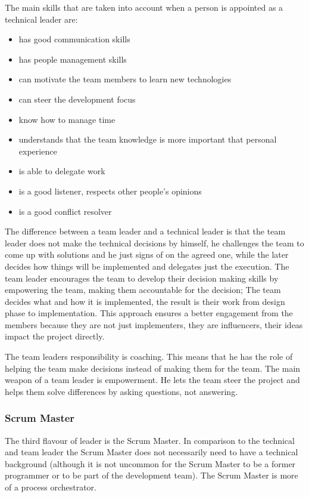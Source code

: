 The main skills that are taken into account when a person is appointed as a technical leader are:

\begin{itemize}
\item has good communication skills
\item has people management skills
\item can motivate the team members to learn new technologies
\item can steer the development focus
\item know how to manage time
\item understands that the team knowledge is more important that personal experience
\item is able to delegate work
\item is a good listener, respects other people's opinions
\item is a good conflict resolver
\end{itemize}

The difference between a team leader and a technical leader is that the team leader does not make the technical decisions by himself, he challenges the team to come up with solutions and he just signs of on the agreed one, while the later decides how things will be implemented and delegates just the execution. The team leader encourages the team to develop their decision making skills by empowering the team, making them accountable for the decision; The team decides what and how it is implemented, the result is their work from design phase to implementation. This approach ensures a better engagement from the members because they are not just implementers, they are influencers, their ideas impact the project directly.

The team leaders responsibility is coaching. This means that he has the role of helping the team make decisions instead of making them for the team. The main weapon of a team leader is empowerment. He lets the team steer the project and helps them solve differences by asking questions, not answering.

\subsubsection{Scrum Master}

The third flavour of leader is the Scrum Master. In comparison to the technical and team leader the Scrum Master does not necessarily need to have a technical background (although it is not uncommon for the Scrum Master to be a former programmer or to be part of the development team). The Scrum Master is more of a process orchestrator.

